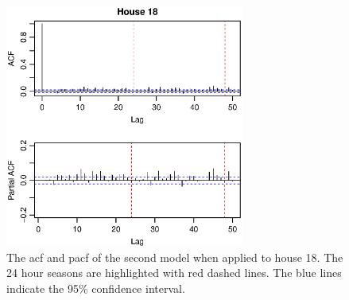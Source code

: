 \begin{figure}[ht]
    \centering
    \includegraphics[width=0.7\textwidth]{../../../figures/arimax/ACF_18_short.eps}
    \caption{The acf and pacf of the second model when applied to house 18. The 24 hour seasons are highlighted with red dashed lines. The blue lines indicate the 95\% confidence interval.}
    \label{fig:Model2_acf_18}
\end{figure}


